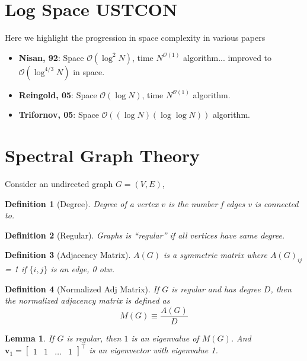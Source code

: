 \documentclass[11pt, letter]{book}
\newcommand{\bv}{\mathbf{v}}
\newtheorem{definition}{Definition}[chapter]
\newtheorem{lemma}[theorem]{Lemma}
\begin{document}
\section{Log Space USTCON}
Here we highlight the progression in space complexity in various papers
\begin{itemize}
	\item \textbf{Nisan, 92}: Space $\mathcal O (\log ^ 2 N)$, time $N ^{\mathcal O (1)}$ algorithm... improved to $\mathcal O (\log ^ {4/3} N)$ in space. 
	\item \textbf{Reingold, 05}: Space $\mathcal O (\log N)$, time $N ^{\mathcal O (1)}$ algorithm. 
	\item \textbf{Trifornov, 05}: Space $\mathcal O ((\log N )(\log\log N))$ algorithm. 
\end{itemize}


\section{Spectral Graph Theory}
Consider an undirected graph $G = (V, E)$, 
\begin{definition}[Degree]
	Degree of a vertex $v$ is the number f edges $v$ is connected to.
\end{definition}

\begin{definition}[Regular]
	Graphs is ``regular'' if all vertices have same degree. 
\end{definition}

\begin{definition}[Adjacency Matrix]
	$A(G)$ is a symmetric matrix where $A(G)_{ij}$ = 1 if $\{i, j\}$ is an edge, 0 otw. 
\end{definition}

\begin{definition}[Normalized Adj Matrix]
	If $G$ is regular and has degree $D$, then the normalized adjacency matrix is defined as 
	\begin{equation}
		M(G) \equiv \frac{A(G)}{D}
	\end{equation}
\end{definition}

\begin{lemma}
	If $G$ is regular, then $1$ is an eigenvalue of $M(G)$. And $\bv_1 = \begin{bmatrix}
		1 & 1 & \dots & 1
	\end{bmatrix}^\top$ is an eigenvector with eigenvalue 1. 
\end{lemma}
\end{document}
